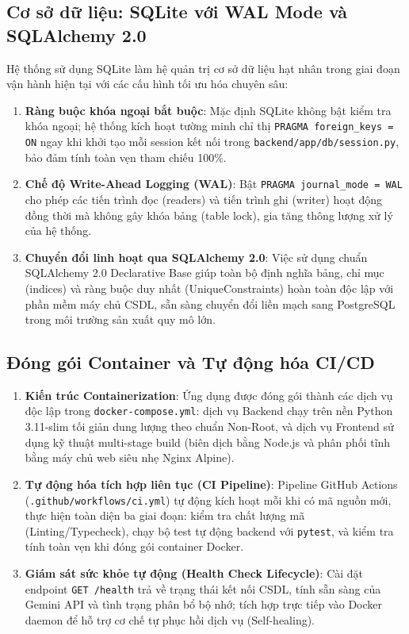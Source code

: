 \subsection{Cơ sở dữ liệu: SQLite với WAL Mode và SQLAlchemy 2.0}
Hệ thống sử dụng SQLite làm hệ quản trị cơ sở dữ liệu hạt nhân trong giai đoạn vận hành hiện tại với các cấu hình tối ưu hóa chuyên sâu:
\begin{enumerate}
  \item \textbf{Ràng buộc khóa ngoại bắt buộc}: Mặc định SQLite không bật kiểm tra khóa ngoại; hệ thống kích hoạt tường minh chỉ thị \texttt{PRAGMA foreign\_keys = ON} ngay khi khởi tạo mỗi session kết nối trong \texttt{backend/app/db/session.py}, bảo đảm tính toàn vẹn tham chiếu 100\%.
  \item \textbf{Chế độ Write-Ahead Logging (WAL)}: Bật \texttt{PRAGMA journal\_mode = WAL} cho phép các tiến trình đọc (readers) và tiến trình ghi (writer) hoạt động đồng thời mà không gây khóa bảng (table lock), gia tăng thông lượng xử lý của hệ thống.
  \item \textbf{Chuyển đổi linh hoạt qua SQLAlchemy 2.0}: Việc sử dụng chuẩn SQLAlchemy 2.0 Declarative Base giúp toàn bộ định nghĩa bảng, chỉ mục (indices) và ràng buộc duy nhất (UniqueConstraints) hoàn toàn độc lập với phần mềm máy chủ CSDL, sẵn sàng chuyển đổi liền mạch sang PostgreSQL trong môi trường sản xuất quy mô lớn.
\end{enumerate}

\subsection{Đóng gói Container và Tự động hóa CI/CD}
\begin{enumerate}
  \item \textbf{Kiến trúc Containerization}: Ứng dụng được đóng gói thành các dịch vụ độc lập trong \texttt{docker-compose.yml}: dịch vụ Backend chạy trên nền Python 3.11-slim tối giản dung lượng theo chuẩn Non-Root, và dịch vụ Frontend sử dụng kỹ thuật multi-stage build (biên dịch bằng Node.js và phân phối tĩnh bằng máy chủ web siêu nhẹ Nginx Alpine).
  \item \textbf{Tự động hóa tích hợp liên tục (CI Pipeline)}: Pipeline GitHub Actions (\texttt{.github/\allowbreak workflows/\allowbreak ci.yml}) tự động kích hoạt mỗi khi có mã nguồn mới, thực hiện toàn diện ba giai đoạn: kiểm tra chất lượng mã (Linting/Typecheck), chạy bộ test tự động backend với \texttt{pytest}, và kiểm tra tính toàn vẹn khi đóng gói container Docker.
  \item \textbf{Giám sát sức khỏe tự động (Health Check Lifecycle)}: Cài đặt endpoint \texttt{GET /health} trả về trạng thái kết nối CSDL, tính sẵn sàng của Gemini API và tình trạng phân bổ bộ nhớ; tích hợp trực tiếp vào Docker daemon để hỗ trợ cơ chế tự phục hồi dịch vụ (Self-healing).
\end{enumerate}

